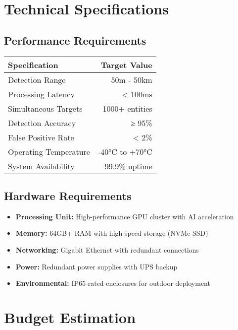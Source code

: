 \documentclass[11pt,a4paper]{article}
\begin{document}
\section{Technical Specifications}

\subsection{Performance Requirements}
\begin{center}
\begin{tabular}{lr}
\toprule
\textbf{Specification} & \textbf{Target Value} \\
\midrule
Detection Range & 50m - 50km \\
Processing Latency & < 100ms \\
Simultaneous Targets & 1000+ entities \\
Detection Accuracy & ≥ 95\% \\
False Positive Rate & < 2\% \\
Operating Temperature & -40°C to +70°C \\
System Availability & 99.9\% uptime \\
\bottomrule
\end{tabular}
\end{center}

\subsection{Hardware Requirements}
\begin{itemize}[leftmargin=2em]
    \item \textbf{Processing Unit:} High-performance GPU cluster with AI acceleration
    \item \textbf{Memory:} 64GB+ RAM with high-speed storage (NVMe SSD)
    \item \textbf{Networking:} Gigabit Ethernet with redundant connections
    \item \textbf{Power:} Redundant power supplies with UPS backup
    \item \textbf{Environmental:} IP65-rated enclosures for outdoor deployment
\end{itemize}

\section{Budget Estimation}
\end{document}
